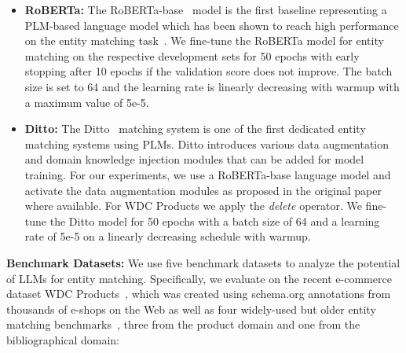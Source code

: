 \documentclass[sigconf,nonacm]{acmart}
\begin{document}
\begin{itemize}
\item\textbf{RoBERTa:} The RoBERTa-base~\cite{liu_roberta_2019} model is the first baseline representing a PLM-based language model which has been shown to reach high performance on the entity matching task~\cite{liDeepEntityMatching2020,peetersDualobjectiveFinetuningBERT2021}.
We fine-tune the RoBERTa model for entity matching on the respective development sets for 50 epochs with early stopping after 10 epochs if the validation score does not improve. The batch size is set to 64 and the learning rate is linearly decreasing with warmup with a maximum value of 5e-5.
\item\textbf{Ditto:} The Ditto~\cite{liDeepEntityMatching2020} matching system is one of the first dedicated entity matching systems using PLMs. Ditto introduces various data augmentation and domain knowledge injection modules that can be added for model training. For our experiments, we use a RoBERTa-base language model and activate the data augmentation modules as proposed in the original paper where available. For WDC Products we apply the \textit{delete} operator. We fine-tune the Ditto model for 50 epochs with a batch size of 64 and a learning rate of 5e-5 on a linearly decreasing schedule with warmup.  
\end{itemize}

\textbf{Benchmark Datasets:}  We use five benchmark datasets to analyze the potential of LLMs for entity matching. Specifically, we evaluate on the recent e-commerce dataset WDC Products~\cite{peeters2023wdc}, which was created using schema.org annotations from thousands of e-shops on the Web as well as four widely-used but older entity matching benchmarks~\cite{kopckeEvaluationEntityResolution2010b}, three from the product domain and one from the bibliographical domain:
\end{document}
